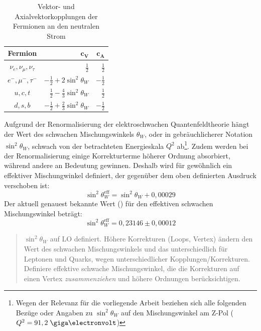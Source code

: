\begin{table}
    \centering
    \renewcommand{\arraystretch}{1.4}
    \begin{tabular}{|c|r|r|}
        \hline
        \bf{Fermion} & $\mathbf{c_V}$ & $\mathbf{c_A}$ \\
        \hline \hline
        $\nu_e,\nu_\mu,\nu_\tau$ & $\frac{1}{2}$ & $\frac{1}{2}$ \\
        $e^-,\mu^-,\tau^-$ & $-\frac{1}{2}+2\sin^2\theta_W$ & $-\frac{1}{2}$   \\
        $u,c,t$ & $\frac{1}{2}-\frac{4}{3}\sin^2\theta_W$ & $\frac{1}{2}$   \\
        $d,s,b$ & $-\frac{1}{2}+\frac{2}{3}\sin^2\theta_W$ & $-\frac{1}{2}$ \\
        \hline
    \end{tabular}
    \caption{Vektor- und Axialvektorkopplungen der Fermionen an den neutralen
        Strom}
    \label{tab:couplings}
\end{table}

Aufgrund der Renormalisierung der elektroschwachen Quantenfeldtheorie hängt der
Wert des schwachen Mischungswinkels $\theta_W$, oder in gebräuchlicherer
Notation $\sin^2\theta_W$, schwach von der betrachteten Energieskala $Q^2$
ab\footnote{Wegen der Relevanz für die vorliegende Arbeit beziehen sich alle
folgenden Bezüge oder Angaben zu $\sin^2\theta_W$ auf den Mischungswinkel am
Z-Pol ($Q^2=91,2\GeV$)}. Zudem werden bei der Renormalisierung einige
Korrekturterme höherer Ordnung absorbiert, während andere an Bedeutung
gewinnen. Deshalb wird für gewöhnlich ein effektiver Mischungwinkel definiert,
der gegenüber dem oben definierten Ausdruck verschoben ist:
\begin{equation}
    \sin^2\theta_W^\text{eff} = \sin^2\theta_W + 0,00029
    \label{eq:effective_angle}
\end{equation}
Der aktuell genauest bekannte Wert (\cite{PhysRevD.86.010001}) für den
effektiven schwachen Mischungswinkel beträgt:
\begin{equation}
    \sin^2\theta_W^\text{eff} = 0,23146 \pm 0,00012
    \label{eq:literature_value}
\end{equation}

\development

\begin{quote}
    $\sin^2\theta_W$ auf LO definiert. Höhere Korrekturen (Loops, Vertex)
    ändern den Wert des schwachen Mischungswinkels und das unterschiedlich für
    Leptonen und Quarks, wegen unterschiedlicher Kopplungen/Korrekturen.
    Definiere effektive schwache Mischungswinkel, die die Korrekturen auf einen
    Vertex \textit{zusammenziehen} und höhere Ordnungen berücksichtigen.
\end{quote}


